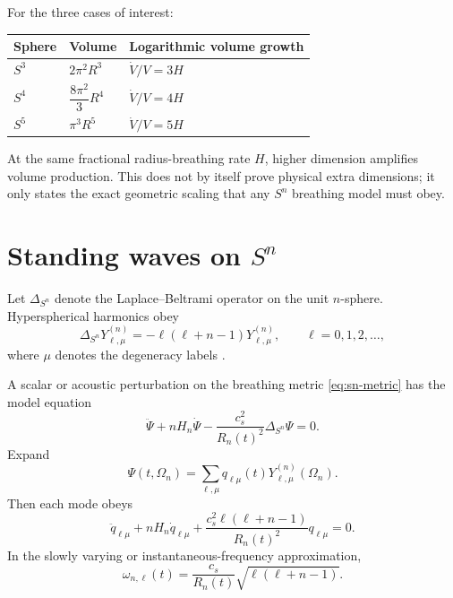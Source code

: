 \documentclass[11pt]{article}
\begin{document}
For the three cases of interest:
\begin{longtable}{@{}lll@{}}
\toprule
Sphere & Volume & Logarithmic volume growth \\
\midrule
$S^3$ & $2\pi^2R^3$ & $\dot V/V=3H$ \\
$S^4$ & $\dfrac{8\pi^2}{3}R^4$ & $\dot V/V=4H$ \\
$S^5$ & $\pi^3R^5$ & $\dot V/V=5H$ \\
\bottomrule
\end{longtable}

At the same fractional radius-breathing rate $H$, higher dimension amplifies volume production.  This does not by itself prove physical extra dimensions; it only states the exact geometric scaling that any $S^n$ breathing model must obey.

\section{\texorpdfstring{Standing waves on $S^n$}{Standing waves on Sn}}

Let $\Delta_{S^n}$ denote the Laplace--Beltrami operator on the unit $n$-sphere.  Hyperspherical harmonics obey
\begin{equation}
 \Delta_{S^n}Y_{\ell,\mu}^{(n)}=-\ell(\ell+n-1)Y_{\ell,\mu}^{(n)},
 \qquad \ell=0,1,2,\dots,
 \label{eq:hyperspherical-eigenvalues}
\end{equation}
where $\mu$ denotes the degeneracy labels \citep{Avery1989}.

A scalar or acoustic perturbation on the breathing metric \eqref{eq:sn-metric} has the model equation
\begin{equation}
 \ddot\Psi+nH_n\dot\Psi-\frac{c_s^2}{R_n(t)^2}\Delta_{S^n}\Psi=0.
 \label{eq:sn-wave}
\end{equation}
Expand
\begin{equation}
 \Psi(t,\Omega_n)=\sum_{\ell,\mu}q_{\ell\mu}(t)Y_{\ell,\mu}^{(n)}(\Omega_n).
\end{equation}
Then each mode obeys
\begin{equation}
 \boxed{
 \ddot q_{\ell\mu}+nH_n\dot q_{\ell\mu}
 +\frac{c_s^2\ell(\ell+n-1)}{R_n(t)^2}q_{\ell\mu}=0.
 }
 \label{eq:mode-equation}
\end{equation}
In the slowly varying or instantaneous-frequency approximation,
\begin{equation}
 \boxed{
 \omega_{n,\ell}(t)=\frac{c_s}{R_n(t)}\sqrt{\ell(\ell+n-1)}.
 }
 \label{eq:frequency-ladder}
\end{equation}
\end{document}
